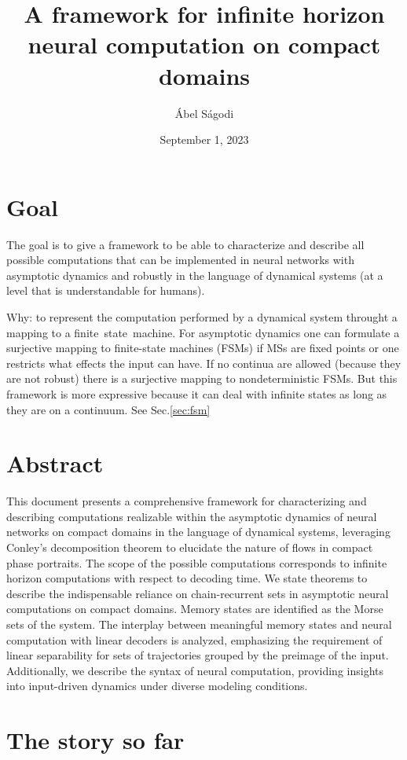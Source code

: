 \documentclass{scrartcl}
\title{A framework for infinite horizon neural computation on compact domains}
\author{\'Abel S\'agodi}
\date{September 1, 2023}
\theoremstyle{definition}
\theoremstyle{remark}
\begin{document}
\maketitle


\section*{Goal}
The goal is to give a framework to be able to characterize and describe all possible computations that can be implemented in neural networks with asymptotic dynamics and robustly in the language of dynamical systems (at a level that is understandable for humans).

Why: to represent the computation performed by a dynamical system throught a mapping to a finite state machine.
For asymptotic dynamics one can formulate a surjective mapping to finite-state machines (FSMs) if MSs are fixed points or one restricts what effects the input can have.
If no continua are allowed (because they are not robust) there is a surjective mapping to nondeterministic FSMs. 
But this framework is more expressive because it can deal with infinite states as long as they are on a continuum.
See Sec.\ref{sec:fsm}

\section*{Abstract}
This document presents a comprehensive framework for characterizing and describing computations realizable within the asymptotic dynamics of neural networks on compact domains in the language of dynamical systems,  leveraging Conley's decomposition theorem to elucidate the nature of flows in compact phase portraits. The scope of the possible computations corresponds to infinite horizon computations with respect to decoding time. We state theorems to describe the indispensable reliance on chain-recurrent sets in asymptotic neural computations on compact domains. Memory states are identified as the Morse sets of the system. The interplay between meaningful memory states and neural computation with linear decoders is analyzed, emphasizing the requirement of linear separability for sets of trajectories grouped by the preimage of the input. 
Additionally, we describe the syntax of neural computation, providing insights into input-driven dynamics under diverse modeling conditions. 

\newpage
\section*{The story so far}
\end{document}
